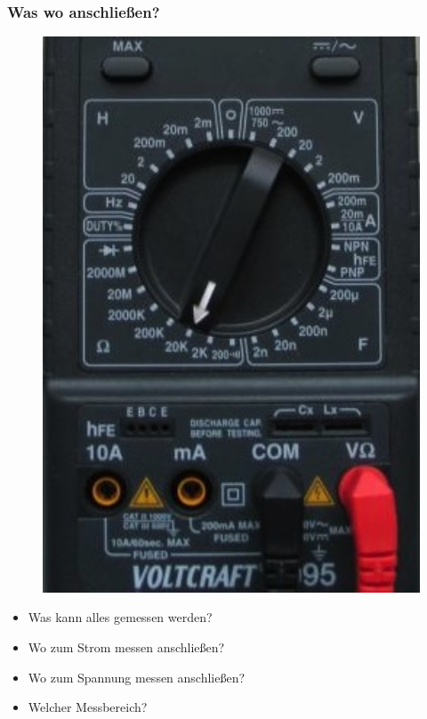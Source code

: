 \begin{frame}
  \frametitle{Was wo anschließen?}
  \begin{minipage}{0.4\textwidth}
    \begin{figure}
      \includegraphics[width=1\textwidth,height=.75\textheight,keepaspectratio]{e02/digitalmultimeterMess.jpg}
    \end{figure}
  \end{minipage}
  \begin{minipage}{0.4\textwidth}
    \begin{itemize}
      \item Was kann alles gemessen werden?
      \item Wo zum Strom messen anschließen?
      \item Wo zum Spannung messen anschließen?
      \item Welcher Messbereich?
    \end{itemize}
  \end{minipage}
\end{frame}

